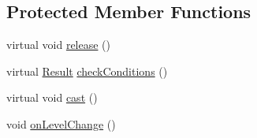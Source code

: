 \subsection*{Protected Member Functions}
\begin{DoxyCompactItemize}
\item 
virtual void \hyperlink{classZeta_1_1ActiveAbility_a0550b9267729ad07ac0b74bb44bb2885}{release} ()
\item 
virtual \hyperlink{classZeta_1_1Ability_acbc80e4d82c9683d190ed8ca1c80f597}{Result} \hyperlink{classZeta_1_1ActiveAbility_a93f4fdf59bfeee2e9876012a36086ce1}{check\+Conditions} ()
\item 
virtual void \hyperlink{classZeta_1_1ActiveAbility_a3c41095a949478a4f5438cc612636bef}{cast} ()
\item 
void \hyperlink{classZeta_1_1ActiveAbility_a6a2a131788a14830aba711262235cf26}{on\+Level\+Change} ()
\end{DoxyCompactItemize}
